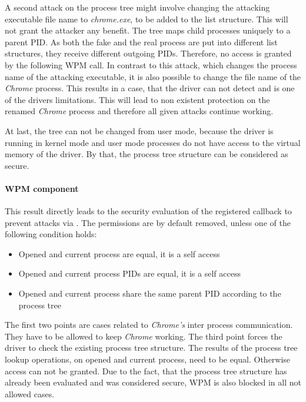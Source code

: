 A second attack on the process tree might involve changing the attacking executable file name to \emph{chrome.exe}, to be added to the list structure. This will not grant the attacker any benefit. The tree maps child processes uniquely to a parent \gls{PID}. As both the fake and the real process are put into different list structures, they receive different outgoing \glspl{PID}. Therefore, no access is granted by the following \gls{WPM} call. In contrast to this attack, which changes the process name of the attacking executable, it is also possible to change the file name of the \emph{Chrome} process. This results in a case, that the driver can not detect and is one of the drivers limitations. This will lead to non existent protection on the renamed \emph{Chrome} process and therefore all given attacks continue working.

At last, the tree can not be changed from user mode, because the driver is running in kernel mode and user mode processes do not have access to the virtual memory of the driver. By that, the process tree structure can be considered as secure.

\paragraph{WPM component}
This result directly leads to the security evaluation of the registered callback to prevent attacks via . The permissions are by default removed, unless one of the following condition holds:
\begin{itemize}
\item Opened and current process are equal, it is a self access
\item Opened and current process \glspl{PID} are equal, it is a self access
\item Opened and current process share the same parent \gls{PID} according to the process tree
\end{itemize}
The first two points are cases related to \emph{Chrome's} inter process communication. They have to be allowed to keep \emph{Chrome} working. The third point forces the driver to check the existing process tree structure. The results of the process tree lookup operations, on opened and current process, need to be equal. Otherwise access can not be granted. Due to the fact, that the process tree structure has already been evaluated and was considered secure, \gls{WPM} is also blocked in all not allowed cases. 

